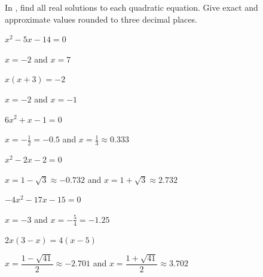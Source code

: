 

In , find all real solutions to each quadratic equation. Give exact and approximate values rounded to three decimal places.


\begin{exercise}\label{exercise-3.4.1}
$x^2-5 x-14=0$
\end{exercise}

\begin{solution}
    $x=-2$ and $x=7$
\end{solution}



\begin{exercise}
$x (x + 3) = -2$
\end{exercise}

\begin{solution}
    $x=-2$ and $x=-1$
\end{solution}



\begin{exercise}
$6x^2+x-1=0$
\end{exercise}

\begin{solution}
  $x=-\frac{1}{2}=-0.5$ and $x=\frac{1}{3}\approx0.333$ 
\end{solution}



\begin{exercise}
$x^2-2x-2=0$
\end{exercise}

\begin{solution}
    $x=1-\sqrt{3}\approx-0.732$ and $x=1+\sqrt{3}\approx2.732$
\end{solution}



\begin{exercise}
$-4x^2-17x-15=0$
\end{exercise}

\begin{solution}
     $x=-3$ and $x=-\frac{5}{4}=-1.25$
\end{solution}



\begin{exercise}\label{exercise-3.4.6}
$2 x (3 - x) = 4 (x - 5)$
\end{exercise}

\begin{solution}
     $x=\dfrac{1-\sqrt{41}}{2}\approx-2.701$ and $x=\dfrac{1+\sqrt{41}}{2}\approx3.702$
\end{solution}







